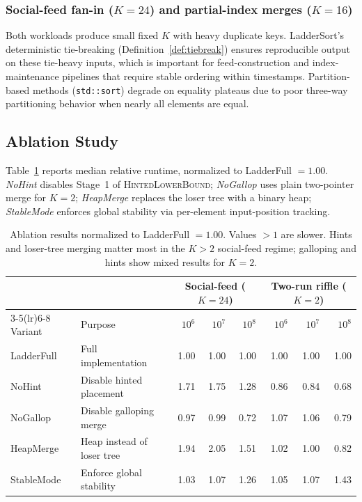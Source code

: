 \documentclass[12pt,a4paper]{article}
\theoremstyle{plain}
\theoremstyle{definition}
\begin{document}
\subsubsection{Social-feed fan-in ($K=24$) and partial-index merges ($K=16$)}
Both workloads produce small fixed $K$ with heavy duplicate keys.
LadderSort's deterministic tie-breaking (Definition~\ref{def:tiebreak})
ensures reproducible output on these tie-heavy inputs, which is important for
feed-construction and index-maintenance pipelines that require stable ordering
within timestamps.  Partition-based methods (\texttt{std::sort}) degrade on
equality plateaus due to poor three-way partitioning behavior when nearly all
elements are equal.

\subsection{Ablation Study}
\label{sec:ablation}

Table~\ref{tab:phase4-ablation} reports median relative runtime, normalized
to LadderFull $= 1.00$.  \emph{NoHint} disables Stage~1 of
\textsc{HintedLowerBound}; \emph{NoGallop} uses plain two-pointer merge for
$K=2$; \emph{HeapMerge} replaces the loser tree with a binary heap;
\emph{StableMode} enforces global stability via per-element input-position tracking.

\begin{table}[H]
\centering\small
\caption{Ablation results normalized to LadderFull $= 1.00$.  Values $> 1$
  are slower.  Hints and loser-tree merging matter most in the $K > 2$
  social-feed regime; galloping and hints show mixed results for $K=2$.}
\label{tab:phase4-ablation}
\begin{tabularx}{\linewidth}{@{}lXrrrrrr@{}}
\toprule
& & \multicolumn{3}{c}{Social-feed ($K=24$)} & \multicolumn{3}{c}{Two-run riffle ($K=2$)} \\
\cmidrule(lr){3-5}\cmidrule(lr){6-8}
Variant & Purpose & $10^6$ & $10^7$ & $10^8$ & $10^6$ & $10^7$ & $10^8$ \\
\midrule
LadderFull & Full implementation      & 1.00 & 1.00 & 1.00 & 1.00 & 1.00 & 1.00 \\
NoHint     & Disable hinted placement & 1.71 & 1.75 & 1.28 & 0.86 & 0.84 & 0.68 \\
NoGallop   & Disable galloping merge  & 0.97 & 0.99 & 0.72 & 1.07 & 1.06 & 0.79 \\
HeapMerge  & Heap instead of loser tree & 1.94 & 2.05 & 1.51 & 1.02 & 1.00 & 0.82 \\
StableMode & Enforce global stability  & 1.03 & 1.07 & 1.26 & 1.05 & 1.07 & 1.43 \\
\bottomrule
\end{tabularx}
\end{table}
\end{document}
